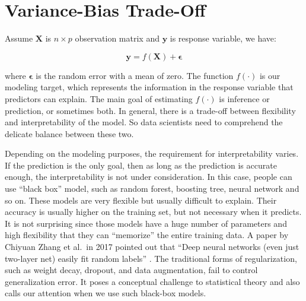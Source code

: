 \documentclass[
  12pt,
]{krantz}
\begin{document}
\hypertarget{vbtradeoff}{%
\section{Variance-Bias Trade-Off}\label{vbtradeoff}}

Assume \(\mathbf{X}\) is \(n \times p\) observation matrix and \(\mathbf{y}\) is response variable, we have:

\begin{equation}
\mathbf{y}=f(\mathbf{X})+\mathbf{\epsilon}
\label{eq:generalmodeleq}
\end{equation}

where \(\mathbf{\epsilon}\) is the random error with a mean of zero. The function \(f(\cdot)\) is our modeling target, which represents the information in the response variable that predictors can explain. The main goal of estimating \(f(\cdot)\) is inference or prediction, or sometimes both. In general, there is a trade-off between flexibility and interpretability of the model. So data scientists need to comprehend the delicate balance between these two.

Depending on the modeling purposes, the requirement for interpretability varies. If the prediction is the only goal, then as long as the prediction is accurate enough, the interpretability is not under consideration. In this case, people can use ``black box'' model, such as random forest, boosting tree, neural network and so on. These models are very flexible but usually difficult to explain. Their accuracy is usually higher on the training set, but not necessary when it predicts. It is not surprising since those models have a huge number of parameters and high flexibility that they can ``memorize'' the entire training data. A paper by Chiyuan Zhang et al.~in 2017 pointed out that ``Deep neural networks (even just two-layer net) easily fit random labels'' \citep{rethinkDL}. The traditional forms of regularization, such as weight decay, dropout, and data augmentation, fail to control generalization error. It poses a conceptual challenge to statistical theory and also calls our attention when we use such black-box models.
\end{document}
